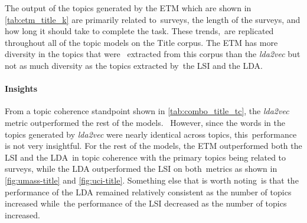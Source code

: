 \documentclass[letterpaper,12pt]{article}
\begin{document}
The output of the topics generated by the ETM which are shown in \ref{tab:etm_title_k} are primarily related to\
surveys, the length of the surveys, and how long it should take to complete the task. These trends,\
are replicated throughout all of the topic models on the Title corpus. The ETM has more diversity in the topics that were \
extracted from this corpus than the \emph{lda2vec} but not as much diversity as the topics extracted by\
the LSI and the LDA.

\paragraph{Insights}
From a topic coherence standpoint shown in \ref{tab:combo_title_tc}, the \emph{lda2vec} metric outperformed the rest of the models. \
However, since the words in the topics generated by \emph{lda2vec} were nearly identical across topics, this\
performance is not very insightful. For the rest of the models, the ETM outperformed both the LSI and the LDA\
in topic coherence with the primary topics being related to surveys, while the LDA outperformed the LSI on both\
metrics as shown in \ref{fig:umass-title} and \ref{fig:uci-title}. Something else that is worth noting\
is that the performance of the LDA remained relatively consistent as the number of topics increased while\
the performance of the LSI decreased as the number of topics increased.
\end{document}
